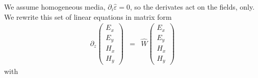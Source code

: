 \documentclass[12pt,a4paper,twoside,openright,BCOR10mm,headsepline,titlepage,abstracton,chapterprefix,final]{scrreprt}
\newcommand\Tensor[1]{\hat{#1}}
\newcommand\scalarEfield{E}
\newcommand\scalarHfield{H}
\newcommand\permittivity{\Tensor{\scalarpermittivity}}
\newcommand\scalarpermittivity{\varepsilon}
\begin{document}
We assume homogeneous media, $\partial_i \permittivity = 0$, 
so the derivates act on the fields, only.
We rewrite this set of linear equations in matrix form
\begin{eqnarray}
   \partial_z 
     \begin{pmatrix} 
     \scalarEfield_x \\ \scalarEfield_y  \\ \scalarHfield_x \\ \scalarHfield_y \end{pmatrix}
   &=&
        \Tensor{W}
     \begin{pmatrix} 
     \scalarEfield_x \\ \scalarEfield_y  \\ \scalarHfield_x \\ \scalarHfield_y \end{pmatrix}
\end{eqnarray}
with
\end{document}
